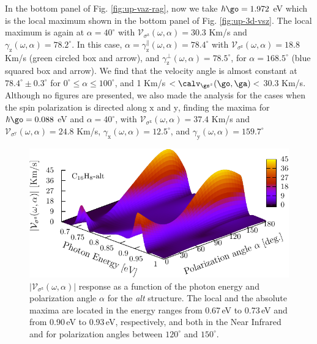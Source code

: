 \documentclass[prb,11pt,tightenlines,twocolumn,aps]{revtex4-1}
\begin{document}
In the bottom panel of Fig. \ref{fig:up-vaz-rag}, now we take
$\hbar\go=1.972$ eV which is the local maximum 
shown in the bottom panel of Fig. \ref{fig:up-3d-vsz}. 
The local maximum is
again at  $\alpha = 40^{\circ}$ with
$\mathcal{V}_{\sigma^{\mathrm{z}}} (\omega,\alpha) =
30.3$ Km/s and $\gamma_{\mathrm{z}}(\omega,\alpha) =
78.2^{\circ}$.
% 
In this case,  
$\alpha =\gamma_{\mathrm{z}}^\parallel(\omega,\alpha) = 78.4^{\circ}$ with
$\mathcal{V}_{\sigma^{\mathrm{z}}}(\omega,\alpha) =18.8$ Km/s 
(green circled box and arrow),
and
% 
$\gamma_{\mathrm{z}}^\perp(\omega,\alpha) = 78.5^{\circ}$, for 
$\alpha =168.5^ {\circ}$ 
(blue squared box and arrow).
% 
We find  that the velocity angle is almost constant at
$78.4^{\circ}\pm 0.3^\circ$ 
for  $0^{\circ} \leq
\alpha \leq 100^{\circ}$,
and 1 Km/s $<\calv_{\gs^z}(\go,\ga)<$ 30.3 Km/s.
% 
Although no figures are presented, we also made the analysis for the
cases when the spin polarization is directed 
along $\mathrm{x}$ and $\mathrm{y}$, finding 
the maxima for
$\hbar\go=0.088$ eV and $\alpha=40^{\circ}$, with
$\mathcal{V}_{\sigma^{\mathrm{x}}}(\omega,\alpha)=37.4$ Km/s and
$\mathcal{V}_{\sigma^{\mathrm{y}}}(\omega,\alpha)=24.8$ Km/s,
$\gamma_{\mathrm{x}}(\omega,\alpha) = 12.5^{\circ}$, and 
$\gamma_{\mathrm{y}}(\omega,\alpha) = 159.7^{\circ}$


\begin{figure}[tb]
    \centering
    \includegraphics[width=\linewidth]{altplots/alt-3d-svaz}
    \caption{$|\mathcal{V}_{\sigma^{\mathrm{z}}}(\omega,\alpha)|$ response
    as a function of the photon energy and polarization angle $\alpha$  for the
    \emph{alt} structure. The local and the absolute maxima are located in the
    energy ranges from 0.67\,eV to 0.73\,eV and from 0.90\,eV to 0.93\,eV,
    respectively, and both in the Near Infrared and for polarization angles
    between $120^{\circ}$ and $150^{\circ}$.}
    \label{fig:alt-3d-vsb}
\end{figure}
\end{document}
